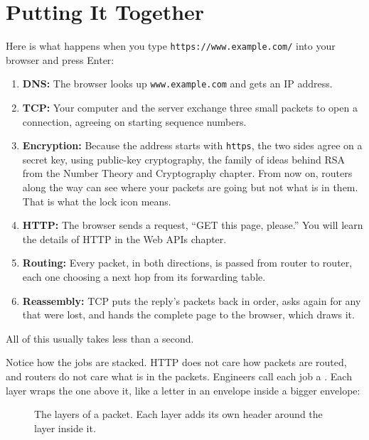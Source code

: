 \section{Putting It Together}
Here is what happens when you type \verb|https://www.example.com/| into your browser and press Enter:
\begin{enumerate}
\item \textbf{DNS:} The browser looks up \verb|www.example.com| and gets an IP address.
\item \textbf{TCP:} Your computer and the server exchange three small packets to open a connection, agreeing
on starting sequence numbers.
\item \textbf{Encryption:} Because the address starts with \verb|https|, the two sides agree on a secret key,
using public-key cryptography, the family of ideas behind RSA from the Number Theory and Cryptography chapter. From now
on, routers along the way can see where your packets are going but not what is in them. That is what the
lock icon means.
\item \textbf{HTTP:} The browser sends a request, ``GET this page, please.'' You will learn the details of
HTTP in the Web APIs chapter.
\item \textbf{Routing:} Every packet, in both directions, is passed from router to router, each one choosing
a next hop from its forwarding table.
\item \textbf{Reassembly:} TCP puts the reply's packets back in order, asks again for any that were lost, and
hands the complete page to the browser, which draws it.
\end{enumerate}
All of this usually takes less than a second.

Notice how the jobs are stacked. HTTP does not care how packets are routed, and routers do not care what is
in the packets. Engineers call each job a . Each layer wraps the one
above it, like a letter in an envelope inside a bigger envelope:

\begin{figure}[htbp]
\centering
{}
\caption{The layers of a packet. Each layer adds its own header around the layer inside it.}
\label{fig:layers}
\end{figure}

